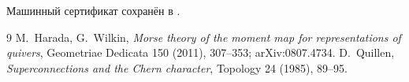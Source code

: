 Машинный сертификат сохранён в
.

\begin{thebibliography}{9}
M.~Harada, G.~Wilkin,
\emph{Morse theory of the moment map for representations of quivers},
Geometriae Dedicata 150 (2011), 307--353; arXiv:0807.4734.
D.~Quillen,
\emph{Superconnections and the Chern character},
Topology 24 (1985), 89--95.
\end{thebibliography}